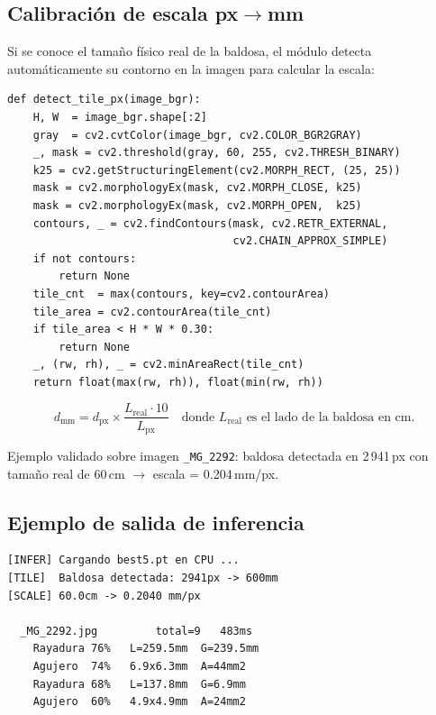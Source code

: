 \documentclass[12pt,a4paper]{article}
\begin{document}
\subsection{Calibración de escala px$\to$mm}

Si se conoce el tamaño físico real de la baldosa, el módulo detecta automáticamente
su contorno en la imagen para calcular la escala:

\begin{lstlisting}[caption={\texttt{detect\_tile\_px()} en \texttt{src/infer.py}}]
def detect_tile_px(image_bgr):
    H, W  = image_bgr.shape[:2]
    gray  = cv2.cvtColor(image_bgr, cv2.COLOR_BGR2GRAY)
    _, mask = cv2.threshold(gray, 60, 255, cv2.THRESH_BINARY)
    k25 = cv2.getStructuringElement(cv2.MORPH_RECT, (25, 25))
    mask = cv2.morphologyEx(mask, cv2.MORPH_CLOSE, k25)
    mask = cv2.morphologyEx(mask, cv2.MORPH_OPEN,  k25)
    contours, _ = cv2.findContours(mask, cv2.RETR_EXTERNAL,
                                   cv2.CHAIN_APPROX_SIMPLE)
    if not contours:
        return None
    tile_cnt  = max(contours, key=cv2.contourArea)
    tile_area = cv2.contourArea(tile_cnt)
    if tile_area < H * W * 0.30:
        return None
    _, (rw, rh), _ = cv2.minAreaRect(tile_cnt)
    return float(max(rw, rh)), float(min(rw, rh))
\end{lstlisting}

\[
  d_{\text{mm}} = d_{\text{px}} \times \frac{L_{\text{real}} \cdot 10}{L_{\text{px}}}
  \quad \text{donde } L_{\text{real}} \text{ es el lado de la baldosa en cm.}
\]

Ejemplo validado sobre imagen \texttt{\_MG\_2292}: baldosa detectada en
2\,941\,px con tamaño real de 60\,cm $\to$ escala = 0.204\,mm/px.

\subsection{Ejemplo de salida de inferencia}

\begin{lstlisting}[language={}]
[INFER] Cargando best5.pt en CPU ...
[TILE]  Baldosa detectada: 2941px -> 600mm
[SCALE] 60.0cm -> 0.2040 mm/px

  _MG_2292.jpg         total=9   483ms
    Rayadura 76%   L=259.5mm  G=239.5mm
    Agujero  74%   6.9x6.3mm  A=44mm2
    Rayadura 68%   L=137.8mm  G=6.9mm
    Agujero  60%   4.9x4.9mm  A=24mm2
\end{lstlisting}

\end{document}
